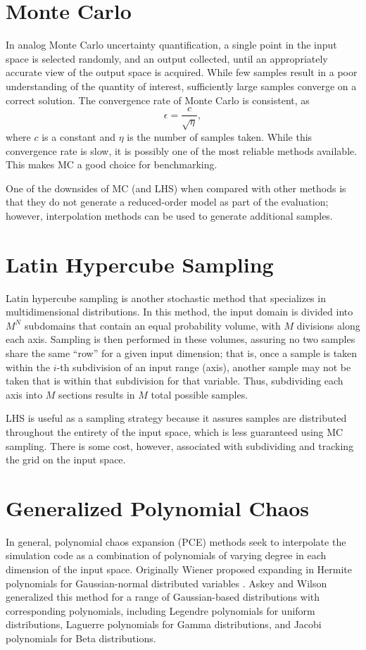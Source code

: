 \section{Monte Carlo}
In analog Monte Carlo\cite{lhs} uncertainty quantification, a single point in the input space is selected randomly,
and an output collected, until an appropriately accurate view of the output space is acquired.  While few
samples result in a poor understanding of the quantity of interest, sufficiently large samples converge on a
correct solution.  The convergence rate of Monte Carlo is consistent, as
\begin{equation}
  \epsilon = \frac{c}{\sqrt{\eta}},
\end{equation}
where $c$ is a constant and $\eta$ is the number of samples taken.  While this convergence rate is slow, it is possibly one of the
most reliable methods available.  This makes MC a good choice for benchmarking.

One of the downsides of MC (and LHS) when compared with other methods is that they do not generate a
reduced-order model as part of the evaluation; however, interpolation methods can be used to generate
additional samples.

\section{Latin Hypercube Sampling}
Latin hypercube sampling\cite{lhs} is another stochastic method that specializes in multidimensional
distributions.  In this method, the input domain is divided into $M^N$ subdomains that contain an equal
probability volume, with $M$ divisions along each axis.  Sampling is then performed in these volumes, assuring
no two samples share the same ``row'' for a given input dimension; that is, once a sample is taken within the
$i$-th subdivision of an input range (axis), another sample may not be taken that is within that subdivision
for that variable.  Thus, subdividing each axis into $M$ sections results in $M$ total possible samples.

LHS is useful as a sampling strategy because it assures samples are distributed throughout the entirety of the
input space, which is less guaranteed using MC sampling.  There is some cost, however, associated with
subdividing and tracking the grid on the input space.



\section{Generalized Polynomial Chaos}
In general, polynomial chaos expansion (PCE) methods seek to interpolate the simulation code as a combination of
polynomials of varying degree in each dimension of the input space.  Originally Wiener
proposed expanding in Hermite polynomials for Gaussian-normal distributed variables \cite{wiener}.  Askey and
Wilson generalized this method for a range of Gaussian-based distributions with corresponding polynomials,
including Legendre polynomials for uniform distributions, Laguerre polynomials for Gamma distributions, and
Jacobi polynomials for Beta distributions\cite{Wiener-Askey}.

